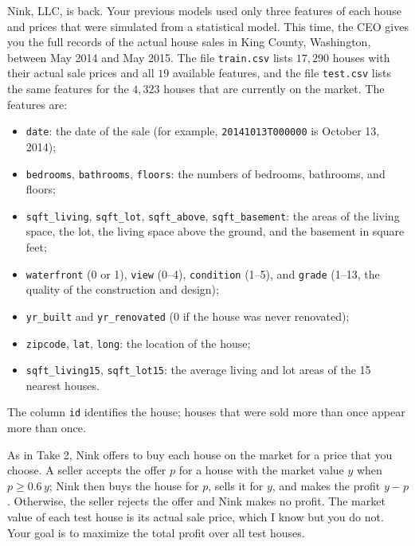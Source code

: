 \documentclass[letterpaper]{article}
\begin{document}
Nink, LLC, is back. Your previous models used only three features of each house and prices that were simulated from a statistical model. This time, the CEO gives you the full records of the actual house sales in King County, Washington, between May 2014 and May 2015. The file \texttt{train.csv} lists $17{,}290$ houses with their actual sale prices and all $19$ available features, and the file \texttt{test.csv} lists the same features for the $4{,}323$ houses that are currently on the market. The features are:
\begin{itemize}
\item \texttt{date}: the date of the sale (for example, \texttt{20141013T000000} is October 13, 2014);
\item \texttt{bedrooms}, \texttt{bathrooms}, \texttt{floors}: the numbers of bedrooms, bathrooms, and floors;
\item \texttt{sqft\_living}, \texttt{sqft\_lot}, \texttt{sqft\_above}, \texttt{sqft\_basement}: the areas of the living space, the lot, the living space above the ground, and the basement in square feet;
\item \texttt{waterfront} (0 or 1), \texttt{view} (0--4), \texttt{condition} (1--5), and \texttt{grade} (1--13, the quality of the construction and design);
\item \texttt{yr\_built} and \texttt{yr\_renovated} (0 if the house was never renovated);
\item \texttt{zipcode}, \texttt{lat}, \texttt{long}: the location of the house;
\item \texttt{sqft\_living15}, \texttt{sqft\_lot15}: the average living and lot areas of the 15 nearest houses.
\end{itemize}
The column \texttt{id} identifies the house; houses that were sold more than once appear more than once.

As in Take 2, Nink offers to buy each house on the market for a price that you choose. A seller accepts the offer $p$ for a house with the market value $y$ when $p \ge 0.6\, y$; Nink then buys the house for $p$, sells it for $y$, and makes the profit $y - p$. Otherwise, the seller rejects the offer and Nink makes no profit. The market value of each test house is its actual sale price, which I know but you do not. Your goal is to maximize the total profit over all test houses.
\end{document}
